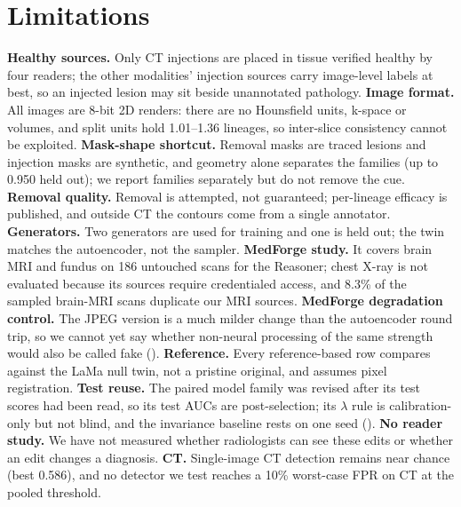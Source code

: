 \section{Limitations}
\label{sec:limitations}

\textbf{Healthy sources.} Only CT injections are placed in tissue verified healthy by four readers; the other modalities' injection sources carry image-level labels at best, so an injected lesion may sit beside unannotated pathology.
\textbf{Image format.} All images are 8-bit 2D renders: there are no Hounsfield units, k-space or volumes, and split units hold 1.01--1.36 lineages, %
so inter-slice consistency cannot be exploited.
\textbf{Mask-shape shortcut.} Removal masks are traced lesions and injection masks are synthetic, and geometry alone separates the families (up to 0.950 held out); %
we report families separately but do not remove the cue.
\textbf{Removal quality.} Removal is attempted, not guaranteed; per-lineage efficacy is published, and outside CT the contours come from a single annotator.
\textbf{Generators.} Two generators are used for training and one is held out; the twin matches the autoencoder, not the sampler.
\textbf{MedForge study.} It covers brain MRI and fundus on 186 untouched scans for the Reasoner; %
chest X-ray is not evaluated because its sources require credentialed access, and 8.3\% of the sampled brain-MRI scans duplicate our MRI sources. %
\textbf{MedForge degradation control.} The JPEG version is a much milder change than the autoencoder round trip, so we cannot yet say whether non-neural processing of the same strength would also be called fake ().
\textbf{Reference.} Every reference-based row compares against the LaMa null twin, not a pristine original, and assumes pixel registration.
\textbf{Test reuse.} The paired model family was revised after its test scores had been read, so its test AUCs are post-selection; its $\lambda$ rule is calibration-only but not blind, and the invariance baseline rests on one seed ().
\textbf{No reader study.} We have not measured whether radiologists can see these edits or whether an edit changes a diagnosis.
\textbf{CT.} Single-image CT detection remains near chance (best 0.586), %
and no detector we test reaches a 10\% worst-case FPR on CT at the pooled threshold. %

